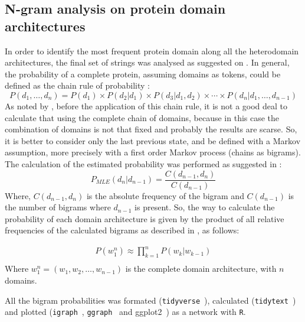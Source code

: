 \documentclass[11pt]{article}
\begin{document}
\subsection*{N-gram analysis on protein domain architectures}
In order to identify the most frequent protein domain along all the heterodomain
architectures, the final set of strings was analysed as suggested on \cite{Yu:2019}.
In general, the probability of a complete protein, assuming domains as tokens, could be
defined as the chain rule of probability \cite{Jurafsky:2018Book}:
\begin{equation}\label{eqProbAll}
P(d_1,\ldots,d_n) = P(d_1) \times P(d_2|d_1) \times P(d_3|d_1,d_2) \times \cdots \times P(d_n|d_1, \ldots , d_{n-1})
\end{equation}
As noted by \cite{Yu:2019}, before the application of this chain rule, 
it is not a good deal to calculate that using the complete chain of domains, because in this case
the combination of domains is not that fixed and probably the results are scarse. So, 
it is better to consider only the last previous state, and be defined with a Markov assumption,
more precisely with a first order Markov process (chains as bigrams). 
The calculation of the estimated probability was performed as suggested in \cite{Yu:2019}:
\begin{equation}\label{eqEST}
P_{MLE} (d_n|d_{n-1}) = \frac{C (d_{n-1},d_n)}{C (d_{n-1})}
\end{equation}
Where, $C(d_{n-1},d_n)$ is the absolute frequency of the bigram and $C(d_{n-1})$ is the number
of bigrams where $d_{n-1}$ is present. So, the way to calculate the probability of 
each domain architecture is given by the product of all relative frequencies of the 
calculated bigrams as described in \cite{Jurafsky:2018Book}, as follows:

\begin{equation}\label{eqFinalProd}
  \begin{split}
    P(w_1^n) \approx \prod_{k=1}^n P(w_k|w_{k-1}) \\ 
  \end{split}
\end{equation}
Where $w_1^n = (w_1, w_2, \dots, w_{n-1})$ is the complete domain architecture, with $n$ domains.

All the bigram probabilities was formated (\texttt{tidyverse}~\cite{wickham:2017}), calculated 
(\texttt{tidytext}~\cite{Wickham:2016}) and plotted (\texttt{igraph}~\cite{Csardi:2006}, 
\texttt{ggraph}~\cite{Pedersen:2018} and ggplot2~\cite{Wickham:2016a}) as a network with 
\texttt{R}.
\end{document}
